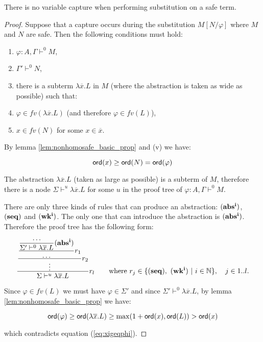\begin{lem}
\label{lem:noclash} There is no variable capture when performing
substitution on a safe term.
\end{lem}
\begin{proof}
Suppose that a capture occurs during the substitution $M[N/\varphi]$
where $M$ and $N$ are safe. Then the following conditions must hold:
\begin{enumerate}
\item $\varphi:A, \Gamma \vdash^0 M$,
\item $\Gamma' \vdash^0 N$,
\item there is a subterm $\lambda \overline{x} . L$ in $M$ (where the abstraction is taken as wide as possible) such that:
\item $\varphi \in fv(\lambda \overline{x} . L)$ (and therefore $\varphi \in fv(L)$),
\item $x \in fv(N)$ for some $x \in \overline{x}$.
\end{enumerate}

By lemma \ref{lem:nonhomosafe_basic_prop} and (v) we have:

\begin{equation}
{\sf ord}(x) \geq {\sf ord}(N) = {\sf ord}(\varphi) \label{eq:xigeqphi}
\end{equation}

The abstraction $\lambda \overline{x} . L$ (taken as large as
possible) is a subterm of $M$, therefore there is a node $\Sigma
\vdash^u \lambda \overline{x} . L$  for some $u$ in the proof tree
of $\varphi:A, \Gamma \vdash^0 M$.

There are only three kinds of rules that can produce an abstraction:
$\mathbf{(abs^i)}$, $\mathbf{(seq)}$ and $\mathbf{(wk^i)}$. The only
one that can introduce the abstraction is $\mathbf{(abs^i)}$.
Therefore the proof tree has the following form:

$$ \rulef{
    \rulef{
        \rulef{
            \rulef  {\ldots}
                   {\Sigma' \vdash^0 \lambda \overline{x} . L} \rulename{abs^i}
        }
        {\ldots} r_1
    }
    {\vdots} r_2
    }
    { \Sigma \vdash^u \lambda \overline{x} . L } r_l
    \qquad \mbox{where } r_j \in \{ \rulename{seq},\ \rulename{wk^i}\ |\ i \in \nat \},
            \quad j\in 1..l.
$$


Since $\varphi \in fv (L)$ we must have $\varphi \in \Sigma'$ and
since $\Sigma' \vdash^0 \lambda \overline{x} . L$, by lemma
\ref{lem:nonhomosafe_basic_prop} we have:

$${\sf ord}(\varphi) \geq {\sf ord}(\lambda \overline{x} . L) \geq \max(1+ {\sf ord}(x), {\sf ord}(L)) > {\sf ord}(x)$$

which contradicts equation (\ref{eq:xigeqphi}).
\end{proof}

